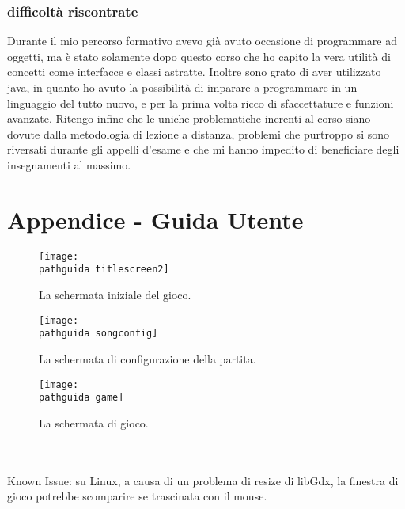 \documentclass[a4paper,12pt]{report}
\newcommand\pathguida{img/guidautente/}
\begin{document}
\subsection{difficoltà riscontrate}
Durante il mio percorso formativo avevo già avuto occasione di programmare ad oggetti, ma è stato solamente dopo questo corso che ho capito la vera utilità di concetti come interfacce e classi astratte. Inoltre sono grato di aver utilizzato java, in quanto ho avuto la possibilità di imparare a programmare in un linguaggio del tutto nuovo, e per la prima volta ricco di sfaccettature e funzioni avanzate.
Ritengo infine che le uniche problematiche inerenti al corso siano dovute dalla metodologia di lezione a distanza, problemi che purtroppo si sono riversati durante gli appelli d'esame e che mi hanno impedito di beneficiare degli insegnamenti al massimo.
\newpage

\chapter{Appendice - Guida Utente}
\begin{figure}[!htb]
	\centerline{\texttt{[image: \\pathguida titlescreen2]}}
	\caption{La schermata iniziale del gioco.}
	\label{img:title}
\end{figure}
\clearpage \hfill\break
\begin{figure}[!htb]
	\centerline{\texttt{[image: \\pathguida songconfig]}}
	\caption{La schermata di configurazione della partita.}
	\label{img:select}
\end{figure}
\clearpage \hfill\break
\begin{figure}[!htb]
	\centerline{\texttt{[image: \\pathguida game]}}
	\caption{La schermata di gioco.}
	\label{img:game}
\end{figure} \\ \\
Known Issue: su Linux, a causa di un problema di resize di libGdx, la finestra di gioco potrebbe scomparire se trascinata con il mouse.
\end{document}
